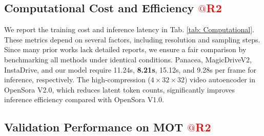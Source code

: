 \subsection{Computational Cost and Efficiency \textcolor{red}{$@$R2}}
We report the training cost and inference latency in Tab. \ref{tab: Computational}. 
These metrics depend on several factors, including resolution and sampling steps. Since many prior works lack detailed reports, we ensure a fair comparison by benchmarking all methods under identical conditions.
Panacea, MagicDriveV2, InstaDrive, and our model require 11.24s, \textbf{8.21s}, 15.12s, and 9.28s per frame for inference, respectively.
The high-compression ($4 \times 32 \times 32$) video autoencoder in OpenSora V2.0, which reduces latent token counts, significantly improves inference efficiency compared with OpenSora V1.0.



\begin{table}[htbp]
    \centering
    \footnotesize
        \centering
        \caption{Comparison of computational cost and inference efficiency under a unified evaluation setup.}
        \label{tab: Computational}
\end{table}





\subsection{Validation Performance on MOT \textcolor{red}{$@$R2}}

